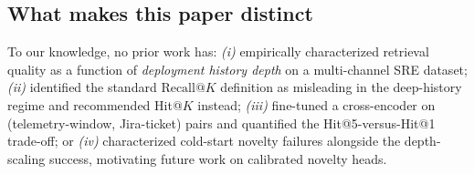 \subsection{What makes this paper distinct}

To our knowledge, no prior work has: \emph{(i)} empirically characterized retrieval quality as a function of \emph{deployment history depth} on a multi-channel SRE dataset; \emph{(ii)} identified the standard $\text{Recall@}K$ definition as misleading in the deep-history regime and recommended Hit@$K$ instead; \emph{(iii)} fine-tuned a cross-encoder on (telemetry-window, Jira-ticket) pairs and quantified the Hit@5-versus-Hit@1 trade-off; or \emph{(iv)} characterized cold-start novelty failures alongside the depth-scaling success, motivating future work on calibrated novelty heads.
